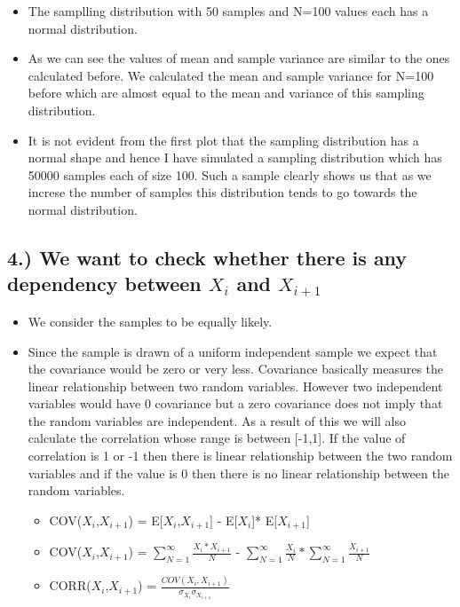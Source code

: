 \documentclass[11pt]{article}
\providecommand{\tightlist}{%
      \setlength{\itemsep}{0pt}\setlength{\parskip}{0pt}}
\begin{document}
\begin{itemize}
\tightlist
\item
  The samplling distribution with 50 samples and N=100 values each has a
  normal distribution.
\item
  As we can see the values of mean and sample variance are similar to
  the ones calculated before. We calculated the mean and sample variance
  for N=100 before which are almost equal to the mean and variance of
  this sampling distribution.
\item
  It is not evident from the first plot that the sampling distribution
  has a normal shape and hence I have simulated a sampling distribution
  which has 50000 samples each of size 100. Such a sample clearly shows
  us that as we increse the number of samples this distribution tends to
  go towards the normal distribution.
\end{itemize}

    \subsection{\texorpdfstring{4.) We want to check whether there is any
dependency between \(X_i\) and
\(X_{i+1}\)}{4.) We want to check whether there is any dependency between X\_i and X\_\{i+1\}}}\label{we-want-to-check-whether-there-is-any-dependency-between-x_i-and-x_i1}

    \begin{itemize}
\item
  We consider the samples to be equally likely.
\item
  Since the sample is drawn of a uniform independent sample we expect
  that the covariance would be zero or very less. Covariance basically
  measures the linear relationship between two random variables. However
  two independent variables would have 0 covariance but a zero
  covariance does not imply that the random variables are independent.
  As a result of this we will also calculate the correlation whose range
  is between {[}-1,1{]}. If the value of correlation is 1 or -1 then
  there is linear relationship between the two random variables and if
  the value is 0 then there is no linear relationship between the random
  variables.

  \begin{itemize}
  \item
    COV(\(X_i\),\(X_{i+1}\)) = E{[}\(X_i\),\(X_{i+1}\){]} -
    E{[}\(X_i\){]}* E{[}\(X_{i+1}\){]}
  \item
    COV(\(X_i\),\(X_{i+1}\)) =
    \(\sum_{N=1}^{\infty} \frac{X_i*X_{i+1}}{N}\) -
    \(\sum_{N=1}^{\infty} \frac{X_i}{N}* \sum_{N=1}^{\infty} \frac{X_{i+1}}{N}\)
  \item
    CORR(\(X_i\),\(X_{i+1}\)) =
    \(\frac{COV(X_i,X_{i+1})}{\sigma_{X_i}\sigma_{X_{i+1}}}\)
  \end{itemize}
\end{itemize}
\end{document}
